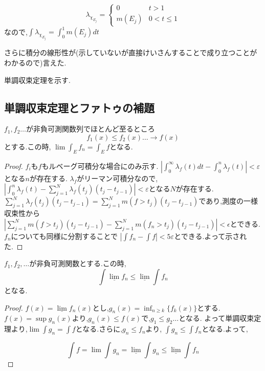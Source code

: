 \begin{equation*}
\lambda_{\chi_{E_j}} = \begin{cases}
 0    & t > 1 \\
 m(E_j)  & 0 < t \le 1
\end{cases}
\end{equation*}
なので,$\int \lambda_{\chi_{E_j}} = \int_0^1 m(E_j) dt$

さらに積分の線形性が(示していないが直接けいさんすることで成り立つことがわかるので)言えた.


単調収束定理を示す.
\subsection{単調収束定理とファトゥの補題}
\begin{thm}[単調収束定理]
$f_1, f_2 \ldots$が非負可測関数列でほとんど至るところ
\begin{equation*}
    f_1(x) \le f_2(x) \ldots \to f(x)
\end{equation*}
とする.この時, $\lim \int_E f_n = \int_E f$となる.
\end{thm}

\begin{proof}
$f_i$も$f$もルベーグ可積分な場合にのみ示す.
$|\int_{0}^{\infty} \lambda_f(t) dt - \int_0^n \lambda_f(t) | < \varepsilon $となる$n$が存在する.
$\lambda_f$がリーマン可積分なので,
$|\int_0^n \lambda_f(t) - \sum _{j=1}^N\lambda_f(t_j)(t_j - t_{j-1})| < \varepsilon$となる$N$が存在する.
$\sum _{j=1}^N\lambda_f(t_j)(t_j - t_{j-1}) = \sum _{j=1}^N m(f > t_j)(t_j - t_{j-1})$であり,測度の一様収束性から
$|\sum _{j=1}^N m(f > t_j)(t_j - t_{j-1}) - \sum _{j=1}^N m(f_n > t_j)(t_j - t_{j-1})| < \epsilon$とできる.
$f_n$についても同様に分割することで
$|\int f_n - \int f |< 5 \varepsilon$とできる.よって示された.
\end{proof}

\begin{thm}[ファトゥの補題]
  $f_1, f_2, \ldots $が非負可測関数とする.この時,
  \begin{equation*}
   \int \underline{\lim} f_n \le \underline{\lim} \int f_n
  \end{equation*}
となる.
\end{thm}
\begin{proof}
$f(x) = \underline{\lim} f_n(x)$とし,$g_n(x) = \inf_{n \ge k} \{ f_k(x) \}$とする.
$f(x) = \sup g_n(x)$より,$g_n(x) \le f(x)$で,$g_1 \le g_2 \ldots$となる.
よって単調収束定理より,$\lim \int g_n = \int f$となる.さらに,$g_n \le f_n$より,
$\int g_n \le \int f_n$となる.よって,

\begin{equation*}
\int f = \lim \int g_n = \underline{\lim} \int g_n  \le \underline{\lim} \int f_n
\end{equation*}
\end{proof}

